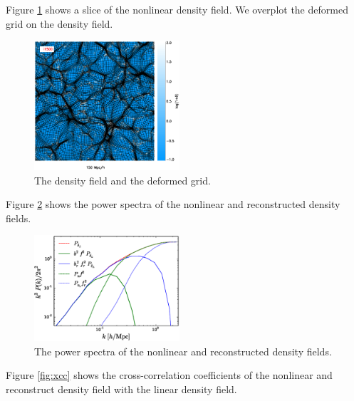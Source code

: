 \documentclass[aps,prd,twocolumn,showpacs,superscriptaddress,groupedaddress,nofootinbib]{revtex4}  %
\begin{document}
Figure \ref{fig:den} shows a slice of the nonlinear density field. 
We overplot the deformed grid on the density field. 

\begin{figure}[tbp]
\begin{center}
\includegraphics[width=0.48\textwidth]{map0512-0128_i1500_.eps}
\end{center}
\vspace{-0.7cm}
\caption{The density field and the deformed grid.}
\label{fig:den}
\end{figure}

Figure \ref{fig:ps} shows the power spectra of the nonlinear and reconstructed
density fields.

\begin{figure}[tbp]
\begin{center}
\includegraphics[width=0.48\textwidth]{fb.eps}
\end{center}
\vspace{-0.7cm}
\caption{The power spectra of the nonlinear and reconstructed density fields.}
\label{fig:ps}
\end{figure}

Figure \ref{fig:xcc} shows the cross-correlation coefficients of the nonlinear
and reconstruct density field with the linear density field.
\end{document}
